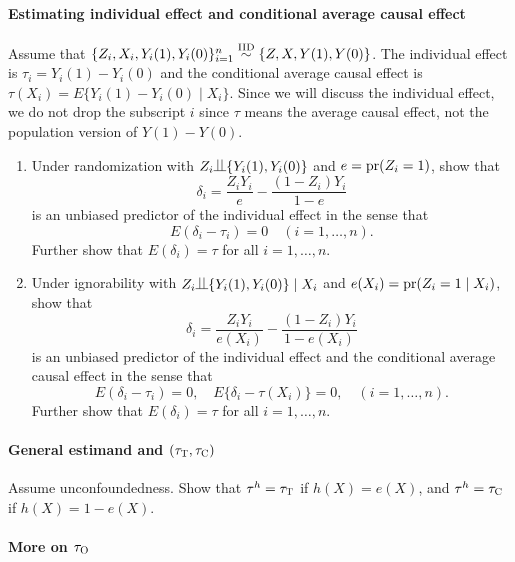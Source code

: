 \paragraph{Estimating individual effect and conditional average causal effect}\label{hw::individual-effect-prediction}

Assume that $\{ Z_i, X_i, Y_i(1), Y_i(0) \}_{i=1}^n \stackrel{\textup{IID}}{\sim} \{ Z, X, Y(1), Y(0) \}$. The individual effect is $\tau_i = Y_i(1) - Y_i(0)$ and the conditional average causal effect is $\tau(X_i) = E\{ Y_i(1) - Y_i(0) \mid X_i  \}$. Since we will discuss the individual effect, we do not drop the subscript $i$ since $\tau$ means the average causal effect, not the population version of $Y(1) - Y(0)$. 

\begin{enumerate}
\item
Under randomization with $Z_i\ind \{ Y_i(1), Y_i(0)  \}$ and $e = \textup{pr}(Z_i = 1)$, show that
$$
\delta_i = \frac{Z_i Y_i}{e} - \frac{(1-Z_i)Y_i}{1-e}
$$
is an unbiased predictor of the individual effect in the sense that
$$
E( \delta_i  -  \tau_i ) = 0\quad (i=1,\ldots, n).
$$
Further show that $E( \delta_i ) = \tau $ for all $i=1,\ldots, n$. 

\item
Under ignorability with $Z_i\ind \{ Y_i(1), Y_i(0)  \}\mid X_i$ and $e(X_i) = \textup{pr}(Z_i=1\mid X_i)$, show that 
$$
\delta_i = \frac{Z_i Y_i}{ e(X_i) } - \frac{(1-Z_i)Y_i}{1-e(X_i)}
$$
is an unbiased predictor of the individual effect and the conditional average causal effect in the sense that
$$
E( \delta_i  -  \tau_i ) = 0, \quad
E\{  \delta_i  -  \tau(X_i) \} = 0, \quad (i=1,\ldots, n).
$$
Further show that $E( \delta_i ) = \tau $ for all $i=1,\ldots, n$. 
\end{enumerate}
 


\paragraph{General estimand and $(\tau_\textsc{T}, \tau_\textsc{C})$}\label{problem::general-estimand-att-atc}


Assume unconfoundedness.
Show that $\tau^h = \tau_\textsc{T}$ if $h(X) = e(X)$, and $\tau^h = \tau_\textsc{C}$ if $h(X) = 1-  e(X)$.


\paragraph{More on $\tau_\textsc{O}$}\label{problem::ATO-treated-control}

